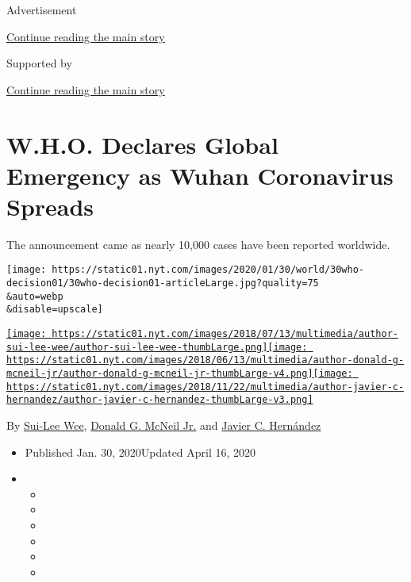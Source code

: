 Advertisement

\protect\hyperlink{after-top}{Continue reading the main story}

Supported by

\protect\hyperlink{after-sponsor}{Continue reading the main story}

\hypertarget{who-declares-global-emergency-as-wuhan-coronavirus-spreads}{%
\section{W.H.O. Declares Global Emergency as Wuhan Coronavirus
Spreads}\label{who-declares-global-emergency-as-wuhan-coronavirus-spreads}}

The announcement came as nearly 10,000 cases have been reported
worldwide.

\texttt{[image: https://static01.nyt.com/images/2020/01/30/world/30who-decision01/30who-decision01-articleLarge.jpg?quality=75\\\&auto=webp\\\&disable=upscale]}

\href{https://www.nytimes.com/by/sui-lee-wee}{\texttt{[image: https://static01.nyt.com/images/2018/07/13/multimedia/author-sui-lee-wee/author-sui-lee-wee-thumbLarge.png]}}\href{https://www.nytimes.com/by/donald-g-mcneil-jr}{\texttt{[image: https://static01.nyt.com/images/2018/06/13/multimedia/author-donald-g-mcneil-jr/author-donald-g-mcneil-jr-thumbLarge-v4.png]}}\href{https://www.nytimes.com/by/javier-c-hernandez}{\texttt{[image: https://static01.nyt.com/images/2018/11/22/multimedia/author-javier-c-hernandez/author-javier-c-hernandez-thumbLarge-v3.png]}}

By \href{https://www.nytimes.com/by/sui-lee-wee}{Sui-Lee Wee},
\href{https://www.nytimes.com/by/donald-g-mcneil-jr}{Donald G. McNeil
Jr.} and \href{https://www.nytimes.com/by/javier-c-hernandez}{Javier C.
Hernández}

\begin{itemize}
\item
  Published Jan. 30, 2020Updated April 16, 2020
\item
  \begin{itemize}
  \item
  \item
  \item
  \item
  \item
  \item
  \end{itemize}
\end{itemize}


